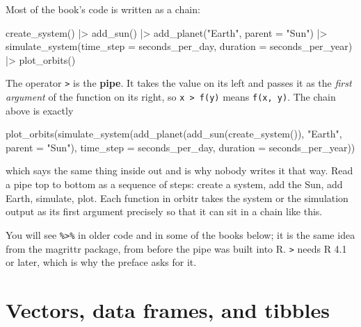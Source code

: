 \documentclass[
  10.5pt,
  letterpaper,
]{scrbook}
\newenvironment{Shaded}{\begin{snugshade}}{\end{snugshade}}
\newcommand{\AttributeTok}[1]{\textcolor[rgb]{0.00,0.00,0.00}{#1}}
\newcommand{\FunctionTok}[1]{\textcolor[rgb]{0.00,0.00,0.00}{#1}}
\newcommand{\NormalTok}[1]{\textcolor[rgb]{0.00,0.00,0.00}{#1}}
\newcommand{\SpecialCharTok}[1]{\textcolor[rgb]{0.00,0.00,0.00}{#1}}
\newcommand{\StringTok}[1]{\textcolor[rgb]{0.00,0.00,0.00}{#1}}
\theoremstyle{definition}
\theoremstyle{plain}
\theoremstyle{remark}
\begin{document}
Most of the book's code is written as a chain:

\begin{Shaded}
\begin{Highlighting}[]
\FunctionTok{create\_system}\NormalTok{() }\SpecialCharTok{|\textgreater{}}
  \FunctionTok{add\_sun}\NormalTok{() }\SpecialCharTok{|\textgreater{}}
  \FunctionTok{add\_planet}\NormalTok{(}\StringTok{"Earth"}\NormalTok{, }\AttributeTok{parent =} \StringTok{"Sun"}\NormalTok{) }\SpecialCharTok{|\textgreater{}}
  \FunctionTok{simulate\_system}\NormalTok{(}\AttributeTok{time\_step =}\NormalTok{ seconds\_per\_day, }\AttributeTok{duration =}\NormalTok{ seconds\_per\_year) }\SpecialCharTok{|\textgreater{}}
  \FunctionTok{plot\_orbits}\NormalTok{()}
\end{Highlighting}
\end{Shaded}

The operator \texttt{\textbar{}\textgreater{}} is the \textbf{pipe}. It
takes the value on its left and passes it as the \emph{first argument}
of the function on its right, so
\texttt{x\ \textbar{}\textgreater{}\ f(y)} means \texttt{f(x,\ y)}. The
chain above is exactly

\begin{Shaded}
\begin{Highlighting}[]
\FunctionTok{plot\_orbits}\NormalTok{(}\FunctionTok{simulate\_system}\NormalTok{(}\FunctionTok{add\_planet}\NormalTok{(}\FunctionTok{add\_sun}\NormalTok{(}\FunctionTok{create\_system}\NormalTok{()), }\StringTok{"Earth"}\NormalTok{, }\AttributeTok{parent =} \StringTok{"Sun"}\NormalTok{),}
                            \AttributeTok{time\_step =}\NormalTok{ seconds\_per\_day, }\AttributeTok{duration =}\NormalTok{ seconds\_per\_year))}
\end{Highlighting}
\end{Shaded}

which says the same thing inside out and is why nobody writes it that
way. Read a pipe top to bottom as a sequence of steps: create a system,
add the Sun, add Earth, simulate, plot. Each function in orbitr takes
the system or the simulation output as its first argument precisely so
that it can sit in a chain like this.

You will see \texttt{\%\textgreater{}\%} in older code and in some of
the books below; it is the same idea from the magrittr package, from
before the pipe was built into R. \texttt{\textbar{}\textgreater{}}
needs R 4.1 or later, which is why the preface asks for it.

\section{Vectors, data frames, and
tibbles}\label{vectors-data-frames-and-tibbles}
\end{document}
